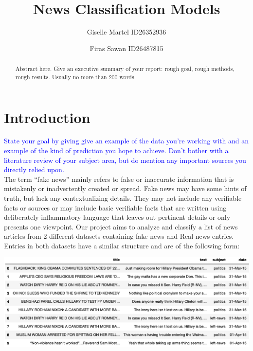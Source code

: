 \documentclass[10pt,twocolumn,letterpaper]{article}
\begin{document}
\title{News Classification Models}
\author{Giselle Martel ID26352936 \and Firas Sawan ID26487815}
\maketitle

\begin{abstract}
   Abstract here. Give an executive summary of your report: rough goal, rough methods, rough results. Usually no more than 200 words.
\end{abstract}

\section{Introduction}
\textcolor{blue}{State your goal by giving give an example of the data you're working with and an example of the kind of prediction you hope to achieve. Don't bother with a literature review of your subject area, but do mention any important sources you directly relied upon.}\\

The term “fake news” mainly refers to false or inaccurate information that is mistakenly or inadvertently created or spread. Fake news may have some hints of truth, but lack any contextualizing details. They may not include any verifiable facts or sources or may include basic verifiable facts that are written using deliberately inflammatory language that leaves out pertinent details or only presents one viewpoint. Our project aims to analyze and classify a list of news articles from 2 different datasets containing fake news and Real news entries. Entries in both datasets have a similar structure and are of the following form:   

\begin{center}
\includegraphics[width=\linewidth]{Latex_Report/report/dt_example.png}
\end{center}
\end{document}
